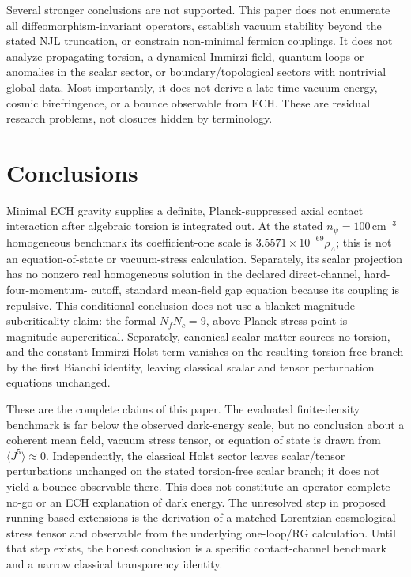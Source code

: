 \documentclass[aps,prd,twocolumn,superscriptaddress,showpacs,preprintnumbers,nofootinbib,longbibliography,floatfix]{revtex4-2}
\begin{document}
Several stronger conclusions are not supported.  This paper does not
enumerate all diffeomorphism-invariant operators, establish vacuum stability
beyond the stated NJL truncation, or constrain non-minimal fermion couplings.
It does not analyze propagating torsion, a dynamical Immirzi field, quantum
loops or anomalies in the scalar sector, or boundary/topological sectors with
nontrivial global data.  Most importantly, it does not derive a late-time
vacuum energy, cosmic birefringence, or a bounce observable from ECH.  These
are residual research problems, not closures hidden by terminology.

\section{Conclusions}\label{sec:conclusions}

Minimal ECH gravity supplies a definite, Planck-suppressed axial contact
interaction after algebraic torsion is integrated out.  At the stated
$n_\psi=100\,\mathrm{cm}^{-3}$ homogeneous benchmark its coefficient-one scale
is $3.5571\times10^{-69}\rho_\Lambda$; this is not an equation-of-state or
vacuum-stress calculation.  Separately, its scalar projection has no nonzero
real homogeneous solution in the declared direct-channel, hard-four-momentum-
cutoff, standard mean-field gap equation because its coupling is repulsive.
This conditional conclusion does not use a blanket magnitude-subcriticality
claim: the formal $N_fN_c=9$, above-Planck stress point is
magnitude-supercritical.  Separately, canonical
scalar matter sources no torsion, and the constant-Immirzi Holst term vanishes
on the resulting torsion-free branch by the first Bianchi identity, leaving
classical scalar and tensor perturbation equations unchanged.

These are the complete claims of this paper.  The evaluated finite-density
benchmark is far below the observed dark-energy scale, but no conclusion about
a coherent mean field, vacuum stress tensor, or equation of state is drawn
from $\langle J^5\rangle\approx0$.  Independently, the classical Holst sector
leaves scalar/tensor perturbations unchanged on the stated torsion-free scalar
branch; it does not yield a bounce observable there.  This does not constitute
an operator-complete no-go or an ECH explanation of dark energy.  The unresolved
step in proposed running-based extensions is the derivation of a matched
Lorentzian cosmological stress tensor and observable from the underlying
one-loop/RG calculation.  Until that step exists, the honest conclusion is a
specific contact-channel benchmark and a narrow classical transparency
identity.
\end{document}
